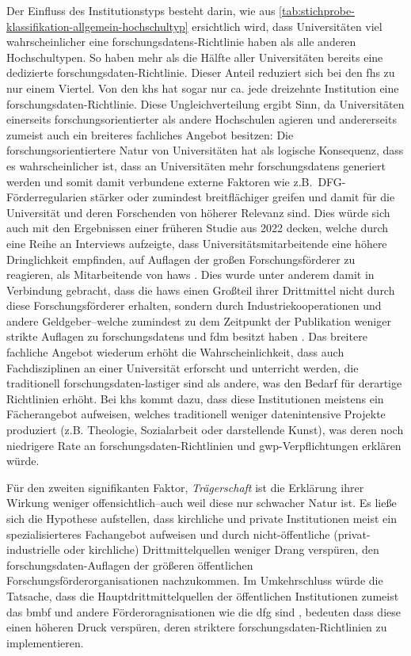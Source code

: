 Der Einfluss des Institutionstyps besteht darin, wie aus \cref{tab:stichprobe-klassifikation-allgemein-hochschultyp} ersichtlich wird, dass Universitäten viel wahrscheinlicher eine \glspl{forschungsdaten}-Richtlinie haben als alle anderen Hochschultypen.
So haben mehr als die Hälfte aller Universitäten bereits eine dedizierte \gls{forschungsdaten}-Richtlinie. 
Dieser Anteil reduziert sich bei den \glspl{fh} zu nur einem Viertel.
Von den \glspl{kh} hat sogar nur ca. jede dreizehnte Institution eine \gls{forschungsdaten}-Richtlinie.
Diese Ungleichverteilung ergibt Sinn, da Universitäten einerseits forschungsorientierter als andere Hochschulen agieren und andererseits zumeist auch ein breiteres fachliches Angebot besitzen:
Die forschungsorientiertere Natur von Universitäten hat als logische Konsequenz, dass es wahrscheinlicher ist, dass an Universitäten mehr \glspl{forschungsdaten} generiert werden und somit damit verbundene externe Faktoren wie z.B.~DFG-Förderregularien stärker oder zumindest breitflächiger greifen und damit für die Universität und deren Forschenden von höherer Relevanz sind.
Dies würde sich auch mit den Ergebnissen einer früheren Studie aus 2022 decken, welche durch eine Reihe an Interviews aufzeigte, dass Universitätsmitarbeitende eine höhere Dringlichkeit empfinden, auf Auflagen der großen Forschungsförderer zu reagieren, als Mitarbeitende von \glspl{haw} \autocite[9]{Dellmann2022}.
Dies wurde unter anderem damit in Verbindung gebracht, dass die \glspl{haw} einen Großteil ihrer Drittmittel nicht durch diese Forschungsförderer erhalten, sondern durch Industriekooperationen und andere Geldgeber--welche zumindest zu dem Zeitpunkt der Publikation weniger strikte Auflagen zu \glspl{forschungsdaten} und \gls{fdm} besitzt haben \autocite{Dellmann2022}.
Das breitere fachliche Angebot wiederum erhöht die Wahrscheinlichkeit, dass auch Fachdisziplinen an einer Universität erforscht und unterricht werden, die traditionell \gls{forschungsdaten}-lastiger sind als andere, was den Bedarf für derartige Richtlinien erhöht.
Bei \glspl{kh} kommt dazu, dass diese Institutionen meistens ein Fächerangebot aufweisen, welches traditionell weniger datenintensive Projekte produziert (z.B. Theologie, Sozialarbeit oder darstellende Kunst), was deren noch niedrigere Rate an \gls{forschungsdaten}-Richtlinien und \gls{gwp}-Verpflichtungen erklären würde.

Für den zweiten signifikanten Faktor, \textit{Trägerschaft} ist die Erklärung ihrer Wirkung weniger offensichtlich--auch weil diese nur schwacher Natur ist.
Es ließe sich die Hypothese aufstellen, dass kirchliche und private Institutionen meist ein spezialisierteres Fachangebot aufweisen und durch nicht-öffentliche (privat-industrielle oder kirchliche) Drittmittelquellen weniger Drang verspüren, den \gls{forschungsdaten}-Auflagen der größeren öffentlichen Forschungsförderorganisationen nachzukommen.
Im Umkehrschluss würde die Tatsache, dass die Hauptdrittmittelquellen der öffentlichen Institutionen zumeist das \gls{bmbf} und andere Förderoragnisationen wie die \gls{dfg} sind \autocite{Dellmann2022}, bedeuten dass diese einen höheren Druck verspüren, deren striktere \gls{forschungsdaten}-Richtlinien zu implementieren.

